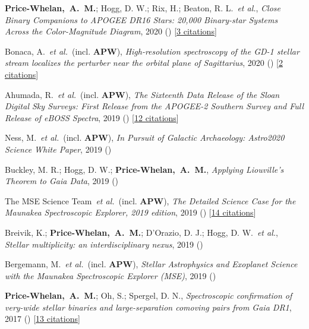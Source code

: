 \item[{\color{deemph}\scriptsize9}]\textbf{Price-Whelan,~A.~M.}; Hogg, D. W.; Rix, H.; Beaton, R. L.~\textit{et al.}, \textit{Close Binary Companions to APOGEE DR16 Stars: 20,000 Binary-star Systems Across the Color-Magnitude Diagram}, 2020 () [\href{http://adsabs.harvard.edu/abs/2020arXiv200200014P}{3 citations}]

\item[{\color{deemph}\scriptsize8}]Bonaca, A.~\textit{et al.}~(incl. \textbf{APW}), \textit{High-resolution spectroscopy of the GD-1 stellar stream localizes the perturber near the orbital plane of Sagittarius}, 2020 () [\href{http://adsabs.harvard.edu/abs/2020arXiv200107215B}{2 citations}]

\item[{\color{deemph}\scriptsize7}]Ahumada, R.~\textit{et al.}~(incl. \textbf{APW}), \textit{The Sixteenth Data Release of the Sloan Digital Sky Surveys: First Release from the APOGEE-2 Southern Survey and Full Release of eBOSS Spectra}, 2019 () [\href{http://adsabs.harvard.edu/abs/2019arXiv191202905A}{12 citations}]

\item[{\color{deemph}\scriptsize6}]Ness, M.~\textit{et al.}~(incl. \textbf{APW}), \textit{In Pursuit of Galactic Archaeology: Astro2020 Science White Paper}, 2019 ()

\item[{\color{deemph}\scriptsize5}]Buckley, M. R.; Hogg, D. W.; \textbf{Price-Whelan,~A.~M.}, \textit{Applying Liouville's Theorem to Gaia Data}, 2019 ()

\item[{\color{deemph}\scriptsize4}]The MSE Science Team~\textit{et al.}~(incl. \textbf{APW}), \textit{The Detailed Science Case for the Maunakea Spectroscopic Explorer, 2019 edition}, 2019 () [\href{http://adsabs.harvard.edu/abs/2019arXiv190404907T}{14 citations}]

\item[{\color{deemph}\scriptsize3}]Breivik, K.; \textbf{Price-Whelan,~A.~M.}; D'Orazio, D. J.; Hogg, D. W.~\textit{et al.}, \textit{Stellar multiplicity: an interdisciplinary nexus}, 2019 ()

\item[{\color{deemph}\scriptsize2}]Bergemann, M.~\textit{et al.}~(incl. \textbf{APW}), \textit{Stellar Astrophysics and Exoplanet Science with the Maunakea Spectroscopic Explorer (MSE)}, 2019 ()

\item[{\color{deemph}\scriptsize1}]\textbf{Price-Whelan,~A.~M.}; Oh, S.; Spergel, D. N., \textit{Spectroscopic confirmation of very-wide stellar binaries and large-separation comoving pairs from Gaia DR1}, 2017 () [\href{http://adsabs.harvard.edu/abs/2017arXiv170903532P}{13 citations}]